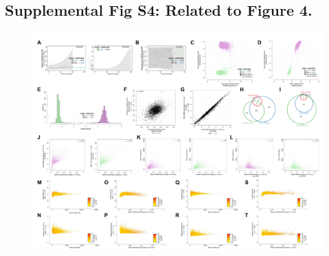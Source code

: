 \documentclass[11pt]{biorxiv}
\begin{document}
\subsection{Supplemental Fig S4: Related to Figure 4.}
\begin{figure}[ht!]
\center
\includegraphics[width=\textwidth, trim={0in 0in 0in 0in}, clip]{figures/Supplemental_Fig_S4_compressed.pdf}
\end{figure}
\end{document}
